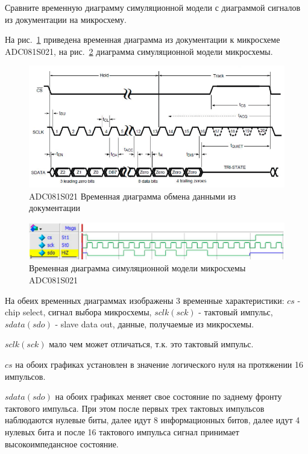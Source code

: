 \documentclass[a4paper,14pt]{article}
\begin{document}
	Сравните временную диаграмму симуляционной модели с	диаграммой сигналов из документации на микросхему. 		
	
	На рис.~\ref{fig:9.7} приведена временная диаграмма из документации к микросхеме ADC081S021, на рис.~\ref{fig:9.11} диаграмма симуляционной модели микросхемы.
	
	\begin{figure}[H]
		\centering
		\includegraphics[width=0.9\linewidth]{images/9_7}
		\caption{ADC081S021 Временная диаграмма обмена данными из документации}
		\label{fig:9.7}
	\end{figure}
	
	
	\begin{figure}[H]
		\centering
		\includegraphics[width=0.9\linewidth]{images/9_11}
		\caption{Временная диаграмма симуляционной модели микросхемы ADC081S021}
		\label{fig:9.11}
	\end{figure}

	На обеих временных диаграммах изображены 3 временные характеристики: $cs$ - chip select, сигнал выбора микросхемы, $sclk(sck)$ - тактовый импульс, $sdata(sdo)$ - slave data out, данные, получаемые из микросхемы.
	
	$sclk(sck)$ мало чем может отличаться, т.к. это тактовый импульс.
	
	$cs$ на обоих графиках установлен в значение логического нуля на протяжении 16 импульсов.
	
	$sdata(sdo)$ на обоих графиках меняет свое состояние по заднему фронту тактового импульса. При этом после первых трех тактовых импульсов наблюдаются нулевые биты, далее идут 8 информационных битов, далее идут 4 нулевых бита и после 16 тактового импульса сигнал принимает высокоимпедансное состояние.
	
\end{document}
